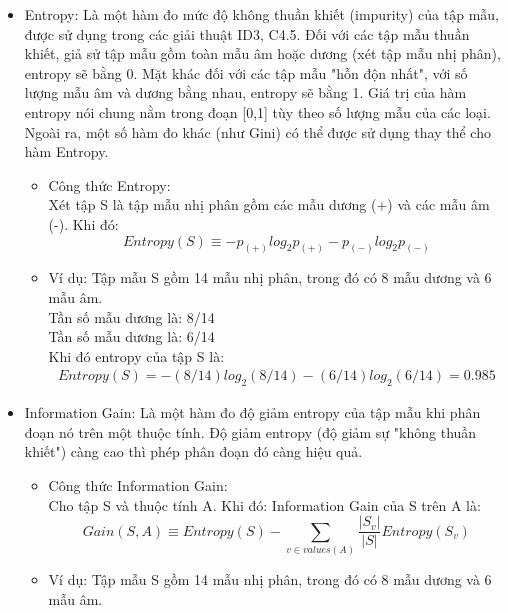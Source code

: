 \documentclass[12pt]{report}
\begin{document}
				\begin{itemize}
					\item{Entropy: Là một hàm đo mức độ không thuần khiết (impurity) của tập mẫu, được sử dụng trong các giải thuật ID3, C4.5. Đối với các tập mẫu thuần khiết, giả sử tập mẫu gồm toàn mẫu âm hoặc dương (xét tập mẫu nhị phân), entropy sẽ bằng 0. Mặt khác đối với các tập mẫu "hỗn độn nhất", với số lượng mẫu âm và dương bằng nhau, entropy sẽ bằng 1. Giá trị của hàm entropy nói chung nằm trong đoạn [0,1] tùy theo số lượng mẫu của các loại. Ngoài ra, một số hàm đo khác (như Gini) có thể được sử dụng thay thể cho hàm Entropy.

					\begin{itemize}
						\item{Công thức Entropy:
						\\Xét tập S là tập mẫu nhị phân gồm các mẫu dương (+) và các mẫu âm (-). Khi đó:
						\begin{equation}					
						Entropy(S) \equiv -p_{(+)}log_{2}p_{(+)} - p_{(-)}log_{2}p_{(-)}
						\end{equation}}						
						\item{Ví dụ: Tập mẫu S gồm 14 mẫu nhị phân, trong đó có 8 mẫu dương và 6 mẫu âm.\\
						Tần số mẫu dương là: 8/14 \\
						Tần số mẫu dương là: 6/14 \\
					 	Khi đó entropy của tập S là:\\	
					 	\begin{align*}						
							Entropy(S) = -(8/14)log_{2}(8/14) - (6/14)log_{2}(6/14) = 0.985
						\end{align*}		
						}
					\end{itemize}}					
					\item{Information Gain: Là một hàm đo độ giảm entropy của tập mẫu khi phân đoạn nó trên một thuộc tính. Độ giảm entropy (độ giảm sự "không thuần khiết") càng cao thì phép phân đoạn đó càng hiệu quả.
					\begin{itemize}
						\item{Công thức Information Gain:
						\\Cho tập S và thuộc tính A. Khi đó: Information Gain của S trên A là:
						\begin{equation}
							\label{eq:gain}
							Gain(S,A) \equiv Entropy(S) - \sum_{v \in values(A)}\frac{|S_v|}{|S|}Entropy(S_v)
						\end{equation}}
						\item{Ví dụ: Tập mẫu S gồm 14 mẫu nhị phân, trong đó có 8 mẫu dương và 6 mẫu âm. 
}
\end{itemize}}
\end{itemize}
\end{document}

